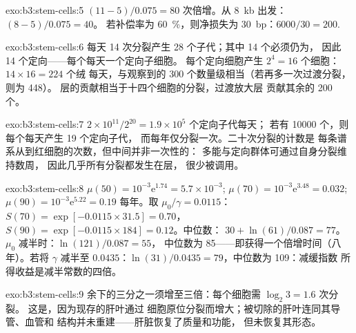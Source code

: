 \begin{solution}{exo:b3:stem-cells:5}
$(11 - 5)/0.075 = 80$ 次倍增。从 \qty{8}{kb} 出发：$(8 - 5)/0.075 = 40$。
若补偿率为 \qty{60}{\%}，则净损失为 \qty{30}{bp}：$6000/30
= 200$.
\end{solution}

\begin{solution}{exo:b3:stem-cells:6}
每天 14 次分裂产生 28 个子代；其中 14 个必须仍为，
因此 14 个定向——每个每天一个定向子细胞。
每个定向细胞产生 $2^{4} = 16$ 个细胞：$14\times 16 = 224$ 个绒
每天，与观察到的 \num{300} 个数量级相当（若再多一次过渡分裂，则为 \num{448}）。
层的贡献相当于十四个细胞的分裂，过渡放大层
贡献其余的 \num{200} 个。
\end{solution}

\begin{solution}{exo:b3:stem-cells:7}
$2\times 10^{11}/2^{20} = 1.9\times 10^{5}$ 个定向子代每天；
若有 \num{10000} 个，则每个每天产生 19 个定向子代，
而每年仅分裂一次。二十次分裂的计数是
每条谱系从到红细胞的次数，但中间并非一次性的：
多能与定向群体可通过自身分裂维持数周，
因此几乎所有分裂都发生在层，
很少被调用。
\end{solution}

\begin{solution}{exo:b3:stem-cells:8}
$\mu(50) = 10^{-3}\mathrm{e}^{1.74} = 5.7\times 10^{-3}$; $\mu(70) =
10^{-3}\mathrm{e}^{3.48} = 0.032$; $\mu(90) = 10^{-3}\mathrm{e}^{5.22} =
0.19$ 每年。取 $\mu_{0}/\gamma = 0.0115$：$S(70) = \exp[-0.0115
\times 31.5] = 0.70$，$S(90) = \exp[-0.0115\times 184] = 0.12$。中位数：
$30 + \ln(61)/0.087 = 77$。$\mu_{0}$ 减半时：$\ln(121)/0.087 = 55$，
中位数为 85——即获得一个倍增时间（八年）。若将 $\gamma$ 减半至
$0.0435$：$\ln(31)/0.0435 = 79$，中位数为 109：减缓指数
所得收益是减半常数的四倍。
\end{solution}

\begin{solution}{exo:b3:stem-cells:9}
余下的三分之一须增至三倍：每个细胞需 $\log_{2}3 = 1.6$ 次分裂。
这是，因为现存的肝叶通过
细胞原位分裂而增大；被切除的肝叶连同其导管、血管和
结构并未重建——肝脏恢复了质量和功能，
但未恢复其形态。
\end{solution}

